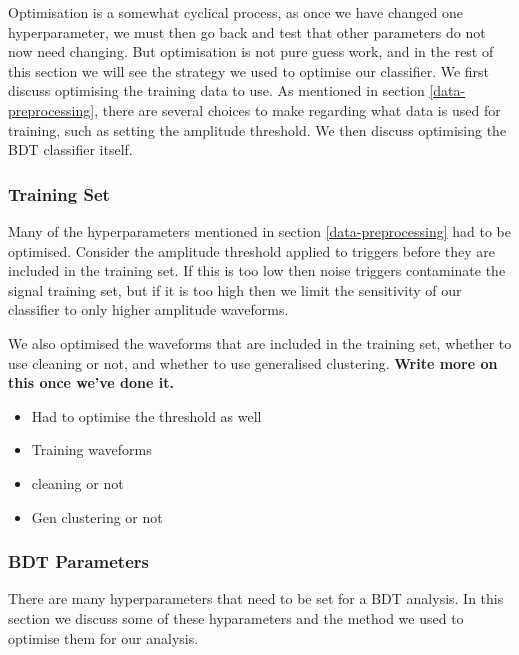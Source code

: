 \documentclass[12pt,twoside,a4paper]{report}
\begin{document}
Optimisation is a somewhat cyclical process, as once we have changed one hyperparameter, we must then go back and test that other parameters do not now need changing. But optimisation is not pure guess work, and in the rest of this section we will see the strategy we used to optimise our classifier. We first discuss optimising the training data to use. As mentioned in section \ref{data-preprocessing}, there are several choices to make regarding what data is used for training, such as setting the amplitude threshold. We then discuss optimising the BDT classifier itself. 

\subsubsection{Training Set}
Many of the hyperparameters mentioned in section \ref{data-preprocessing} had to be optimised. Consider the amplitude threshold applied to triggers before they are included in the training set. If this is too low then noise triggers contaminate the signal training set, but if it is too high then we limit the sensitivity of our classifier to only higher amplitude waveforms. 

We also optimised the waveforms that are included in the training set, whether to use cleaning or not, and whether to use generalised clustering. \textbf{Write more on this once we've done it.}



\begin{itemize}
\item Had to optimise the threshold as well
\item Training waveforms
\item cleaning or not
\item Gen clustering or not
\end{itemize}

\subsubsection{BDT Parameters}
There are many hyperparameters that need to be set for a BDT analysis. In this section we discuss some of these hyparameters and the method we used to optimise them for our analysis. 
\end{document}
